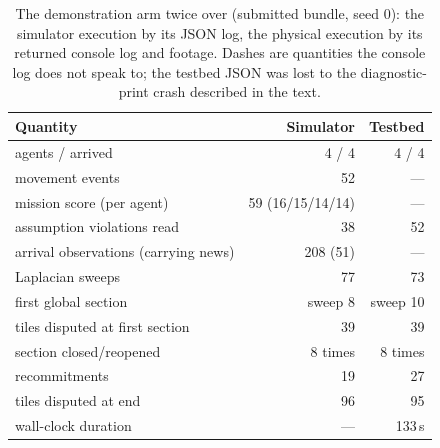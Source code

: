 \documentclass[10pt]{article}
\newif\ifshowcomments
\theoremstyle{definition}
\theoremstyle{remark}
\newcommand{\task}[1]{%
    \ifshowcomments
        ~\todo[inline, color=buzzgold!60, textcolor=black,caption={Task}]{{\bf Task:} #1}%
    \fi
}
\newcommand{\ai}[1]{%
    \ifshowcomments
        \noindent\textcolor{techred}{[AI Agent]: #1}%
    \fi
}
\begin{document}
\begin{table}[h]
\centering
\small
\begin{tabular}{lrr}
\toprule
\textbf{Quantity} & \textbf{Simulator} & \textbf{Testbed}\\
\midrule
agents / arrived & 4 / 4 & 4 / 4\\
movement events & 52 & ---\\
mission score (per agent) & 59 (16/15/14/14) & ---\\
assumption violations read & 38 & 52\\
arrival observations (carrying news) & 208 (51) & ---\\
Laplacian sweeps & 77 & 73\\
first global section & sweep 8 & sweep 10\\
tiles disputed at first section & 39 & 39\\
section closed/reopened & 8 times & 8 times\\
recommitments & 19 & 27\\
tiles disputed at end & 96 & 95\\
wall-clock duration & --- & 133\,s\\
\bottomrule
\end{tabular}
\caption{The demonstration arm twice over (submitted bundle, seed 0): the simulator execution by its JSON log, the physical execution by its returned console log and footage. Dashes are quantities the console log does not speak to; the testbed JSON was lost to the diagnostic-print crash described in the text.}
\label{tab:runstats}
\end{table}

\task{Remaining physical artifacts (TBD): (i) portal confirmation numbers for the three submissions; (ii) optionally, one resubmission of the demonstration arm with the repaired logging, to retrieve the JSON for the exact tile-for-tile parity check the console-log comparison of \Cref{tab:runstats} approximates. Durations, overhead stills, projection legibility, and the event-stream comparison are in hand from the returned footage and console logs of August 12, 2026.}
\ai{I extracted the four stills of \Cref{fig:stills} from \texttt{exp/robotarium/\_videos/Contract sheaf~-~4 robots, 12x8, 6 regions~-~08-12 01:48.mp4} at $t \approx 50, 54, 100, 125$\,s, choosing the moments by reading the projected caption line frame by frame; durations come from the video lengths, and the testbed column of \Cref{tab:runstats} from the console logs you dropped in \texttt{exp/robotarium/logs/}. All three logs end in the same crash: \texttt{main.py} line 728's \texttt{DURATION\_SECONDS} print reads \texttt{robotarium.\_iteration}, which only the local simulator fork has, and it fired \emph{before} \texttt{experiment\_log.close()}, which is why no JSON came back. I fixed \texttt{experiment\_template.py}: the log now closes first and the print is guarded. Rebuilding the bundles picks the fix up.}
\end{document}
